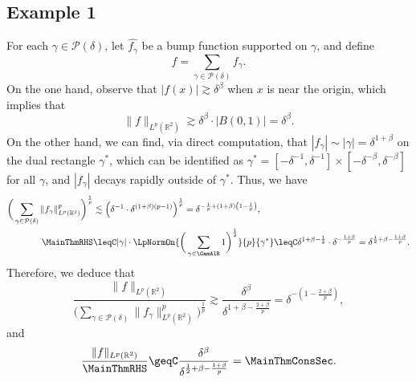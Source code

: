\documentclass[reqno,centertags,11pt,a4paper]{amsart}
\begin{document}
\subsection*{Example 1}
For each $\gamma \in \mathcal{P}(\delta)$, let $\widehat{f_\gamma}$ be a bump function supported on $\gamma$, and define
\[ f = \sum_{\gamma \in \mathcal{P}(\delta)} f_\gamma. \]
On the one hand, observe that $|f(x)| \gtrsim \delta^\beta$ when $x$ is near the origin, which implies that
\begin{equation}
    \|f\|_{L^p(\mathbb{R}^2)} \gtrsim \delta^\beta \cdot |B(0,1)| = \delta^\beta.
\end{equation}
On the other hand, we can find, via direct computation, that $|f_\gamma| \sim |\gamma| = \delta^{1+\beta}$ on the dual rectangle $\gamma^*$, which can be identified as $\gamma^*= [-\delta^{-1},\delta^{-1}] \times[-\delta^{-\beta},\delta^{-\beta}]$ for all $\gamma$, and $|f_\gamma|$ decays rapidly outside of $\gamma^*$.
Thus, we have
\begin{align*}
    \bigg(\sum_{\gamma \in \mathcal{P}(\delta)} \|f_\gamma\|_{L^p(\mathbb{R}^2)}^p\bigg)^{\frac{1}{p}} &\lesssim \left(\delta^{-1} \cdot \delta^{(1+\beta)(p-1)}\right)^{\frac{1}{p}} = \delta^{-\frac{1}{p} + (1+\beta)\left(1 - \frac{1}{p}\right)}, \\
  \MainThmRHS &\leqC |\gamma| \cdot \LpNormOn{\bigg( \sum_{ \gamma \in \GamAlR } 1\bigg)^{\frac{1}{2}}}{p}{ \gamma^* } \leqC \delta^{1+\beta - \frac{1}{2}} \cdot \delta^{-\frac{1+\beta}{p}} = \delta^{\frac{1}{2} + \beta - \frac{1+\beta}{p}}.
\end{align*}
Therefore, we deduce that
\begin{equation*}
    \frac{\|f\|_{L^p(\mathbb{R}^2)}}{\bigg(\sum_{\gamma \in \mathcal{P}(\delta)} \|f_\gamma\|_{L^p(\mathbb{R}^2)}^p\bigg)^{\frac{1}{p}}} \gtrsim \frac{\delta^\beta}{\delta^{1+\beta - \frac{2+\beta}{p} }} = \delta^{-\left(1 - \frac{2+\beta}{p}\right)},
\end{equation*}
and
\[ \frac{\|f\|_{L^p(\mathbb{R}^2)}}{\MainThmRHS} \geqC \frac{\delta^\beta}{\delta^{\frac{1}{2} + \beta - \frac{1+\beta}{p}}} = \MainThmConsSec. \]
\end{document}
